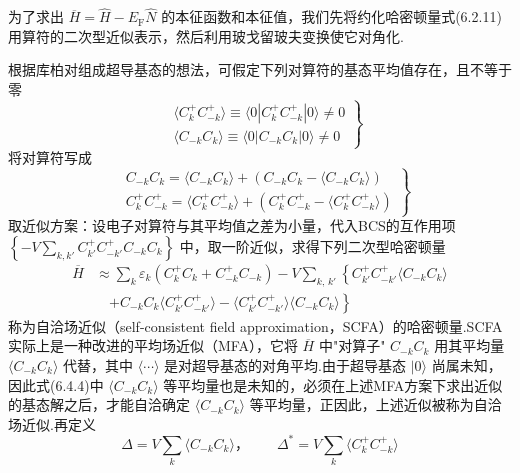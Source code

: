 为了求出 $\overline{H}=\hat{H}-E_{\mathrm{F}}\hat{N}$ 的本征函数和本征值，我们先将约化哈密顿量式(6.2.11)用算符的二次型近似表示，然后利用玻戈留玻夫变换使它对角化.

根据库柏对组成超导基态的想法，可假定下列对算符的基态平均值存在，且不等于零
\begin{equation}
  \left.
  \begin{aligned}
    &\langle C^{+}_{k}C^{+}_{-k}\rangle\equiv
    \langle0|C^{+}_{k}C^{+}_{-k}|0\rangle\neq0\\
    &\langle C_{-k}C_{k}\rangle\equiv
    \langle0|C_{-k}C_{k}|0\rangle\neq0
  \end{aligned}\right\}
\end{equation}
将对算符写成
\begin{equation}
  \left.
  \begin{aligned}
    &C_{-k}C_{k}=\langle C_{-k}C_{k}\rangle
    +\left(C_{-k}C_{k}-\langle C_{-k}C_{k}\rangle\right)\\
    &C^{+}_{k}C^{+}_{-k}=\langle C^{+}_{k}C^{+}_{-k}\rangle
    +\left(C^{+}_{k}C^{+}_{-k}-\langle C^{+}_{k}C^{+}_{-k}\rangle\right)
  \end{aligned}\right\}
\end{equation}
取近似方案：设电子对算符与其平均值之差为小量，代入BCS的互作用项 $\left\{-V\sum_{k,k'}C^{+}_{k'}C^{+}_{-k'}C_{-k}C_{k}\right\}$ 中，取一阶近似，求得下列二次型哈密顿量
\begin{equation}
\begin{aligned}
  \overline{H}&\approx\sum_{k}\varepsilon_{k}
  \left(C^{+}_{k}C_{k}+C^{+}_{-k}C_{-k}\right)
  -V\sum_{k,\,k'}\left\{C^{+}_{k'}C^{+}_{-k'}\langle C_{-k}C_{k}\rangle\right.\\
  &\quad\left.+C_{-k}C_{k}\langle C^{+}_{k'}C^{+}_{-k'}\rangle
  -\langle C^{+}_{k'}C^{+}_{-k'}\rangle\langle C_{-k}C_{k}\rangle\right\}
\end{aligned}
\end{equation}
称为自洽场近似（self-consistent field approximation，SCFA）的哈密顿量.SCFA实际上是一种改进的平均场近似（MFA），它将 $\overline{H}$ 中"对算子" $C_{-k}C_{k}$ 用其平均量 $\langle C_{-k}C_{k}\rangle$ 代替，其中 $\langle\cdots\rangle$ 是对超导基态的对角平均.由于超导基态 $|0\rangle$ 尚属未知，因此式(6.4.4)中 $\langle C_{-k}C_{k}\rangle$ 等平均量也是未知的，必须在上述MFA方案下求出近似的基态解之后，才能自洽确定 $\langle C_{-k}C_{k}\rangle$ 等平均量，正因此，上述近似被称为自洽场近似.再定义
\begin{equation}
  \Delta=V\sum_{k}\langle C_{-k}C_{k}\rangle\text{，}
  \qquad \Delta^{*}=V\sum_{k}\langle C^{+}_{k}C^{+}_{-k}\rangle
\end{equation}
